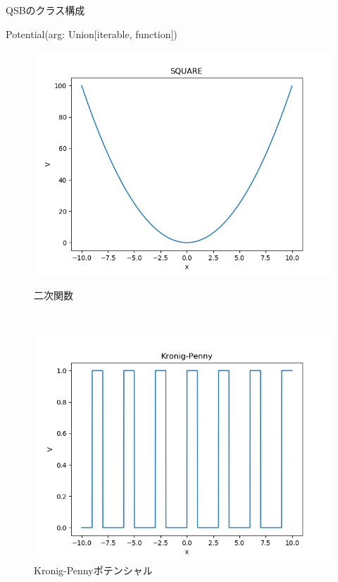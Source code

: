 \documentclass[a4paper, lualatex]{bxjsarticle}
\begin{document}
\begin{section}{QSBのクラス構成\label{AppQ}}
\begin{subsection}{Potential(arg: Union[iterable, function])}
\begin{figure}[h]
\begin{minipage}{0.5\hsize}
                \includegraphics[width=0.9\hsize]{SQUARE.png}
                \caption{二次関数}
            \end{minipage}\\
            \begin{minipage}{0.5\hsize}
                \centering
                \includegraphics[width=0.9\hsize]{Kronig-Penny.png}
                \caption{Kronig-Pennyポテンシャル}
            \end{minipage}
            \begin{minipage}{0.5\hsize}
                \centering

\end{minipage}
\end{figure}
\end{subsection}
\end{section}
\end{document}
